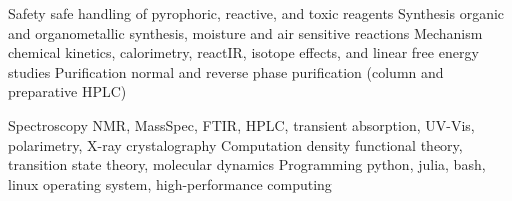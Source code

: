 

\begin{cvskills}
  \cvskill
  {Safety} %
  {safe handling of pyrophoric, reactive, and toxic reagents} %
  \cvskill
  {Synthesis} %
  {organic and organometallic synthesis, moisture and air sensitive reactions} %
  \cvskill
  {Mechanism} %
  {chemical kinetics, calorimetry, reactIR, isotope effects, and linear free energy studies} %
  \cvskill
  {Purification} %
  {normal and reverse phase purification (column and preparative HPLC) } %

  \cvskill
  {Spectroscopy} %
  {NMR, MassSpec, FTIR, HPLC, transient absorption, UV-Vis, polarimetry, X-ray crystalography} %
  \cvskill
  {Computation} %
  {density functional theory, transition state theory, molecular dynamics} %
  \cvskill
  {Programming} %
  {python, julia, bash, linux operating system, high-performance computing} %

\end{cvskills}
